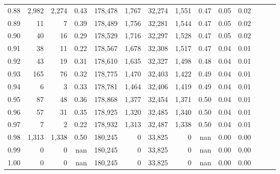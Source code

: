 \begin{tabular}{rrrrrrrrrrrrrr}
0.88 &   2,982 &  2,274 &  0.43 &  178,478 &    1,767 &  32,274 &   1,551 &  0.47 &  0.05 &      0.02 \\
0.89 &      11 &      7 &  0.39 &  178,489 &    1,756 &  32,281 &   1,544 &  0.47 &  0.05 &      0.02 \\
0.90 &      40 &     16 &  0.29 &  178,529 &    1,716 &  32,297 &   1,528 &  0.47 &  0.05 &      0.02 \\
0.91 &      38 &     11 &  0.22 &  178,567 &    1,678 &  32,308 &   1,517 &  0.47 &  0.04 &      0.01 \\
0.92 &      43 &     19 &  0.31 &  178,610 &    1,635 &  32,327 &   1,498 &  0.48 &  0.04 &      0.01 \\
0.93 &     165 &     76 &  0.32 &  178,775 &    1,470 &  32,403 &   1,422 &  0.49 &  0.04 &      0.01 \\
0.94 &       6 &      3 &  0.33 &  178,781 &    1,464 &  32,406 &   1,419 &  0.49 &  0.04 &      0.01 \\
0.95 &      87 &     48 &  0.36 &  178,868 &    1,377 &  32,454 &   1,371 &  0.50 &  0.04 &      0.01 \\
0.96 &      57 &     31 &  0.35 &  178,925 &    1,320 &  32,485 &   1,340 &  0.50 &  0.04 &      0.01 \\
0.97 &       7 &      2 &  0.22 &  178,932 &    1,313 &  32,487 &   1,338 &  0.50 &  0.04 &      0.01 \\
0.98 &   1,313 &  1,338 &  0.50 &  180,245 &        0 &  33,825 &       0 &   nan &  0.00 &      0.00 \\
0.99 &       0 &      0 &   nan &  180,245 &        0 &  33,825 &       0 &   nan &  0.00 &      0.00 \\
1.00 &       0 &      0 &   nan &  180,245 &        0 &  33,825 &       0 &   nan &  0.00 &      0.00 \\
\bottomrule
\end{tabular}
